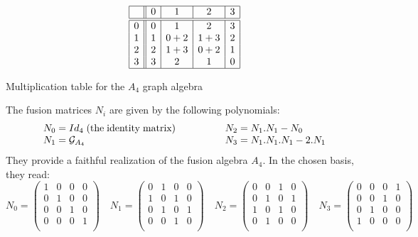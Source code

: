 \documentclass[a4paper,11pt]{article}
\begin{document}
\begin{table}[hhh]
$$
\begin{array}{|c||c|c|c|c|}
\hline
{} & 0 & 1 & 2 & 3 \\
\hline
\hline
0 & 0 & 1 & 2 & 3 \\
1 & 1 & 0+2 & 1+3 & 2 \\
2 & 2 & 1+3 & 0+2 & 1 \\
3 & 3 & 2 & 1 & 0 \\
\hline
\end{array}
$$
\caption{Multiplication table for the $A_4$ graph algebra}
\end{table}
The fusion matrices $N_{i}$ are given by the following polynomials:
$$
\begin{array}{ll}
N_0  = Id_4 \mathrm{\;(the \; identity \; matrix)} \qquad \qquad&
N_2  = N_1 . N_1 - N_0 \\
N_1  = {\cal G}_{A_4} &
N_3  = N_1 . N_1 . N_1 - 2 . N_1 \\
\end{array}
$$
They provide a faithful realization of the fusion algebra $A_4$.
In the chosen basis, they read:
\scriptsize
$$
N_0 = \left( \begin{array}{cccc}
     1 & 0 & 0 & 0 \\
     0 & 1 & 0 & 0 \\
     0 & 0 & 1 & 0 \\
     0 & 0 & 0 & 1 \\
\end{array}
\right)
\quad
N_1 = \left( \begin{array}{cccc}
     0 & 1 & 0 & 0 \\
     1 & 0 & 1 & 0 \\
     0 & 1 & 0 & 1 \\
     0 & 0 & 1 & 0 \\
\end{array}
\right)
\quad
N_2 = \left( \begin{array}{cccc}
     0 & 0 & 1 & 0 \\
     0 & 1 & 0 & 1 \\
     1 & 0 & 1 & 0 \\
     0 & 1 & 0 & 0 \\
\end{array}
\right)
\quad
N_3 = \left( \begin{array}{cccc}
     0 & 0 & 0 & 1 \\
     0 & 0 & 1 & 0 \\
     0 & 1 & 0 & 0 \\
     1 & 0 & 0 & 0 \\
\end{array}
\right)
$$
\end{document}
